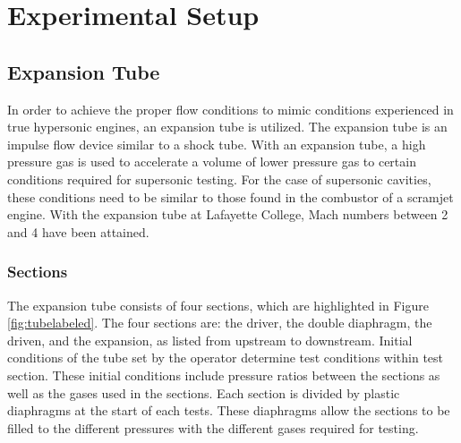 
\chapter{Experimental Setup} %

\label{Chapter3} %



\section{Expansion Tube}

In order to achieve the proper flow conditions to mimic conditions experienced in true hypersonic engines, an expansion tube is utilized. The expansion tube is an impulse flow device similar to a shock tube. With an expansion tube, a high pressure gas is used to accelerate a volume of lower pressure gas to certain conditions required for supersonic testing. For the case of supersonic cavities, these conditions need to be similar to those found in the combustor of a scramjet engine. With the expansion tube at Lafayette College, Mach numbers between 2 and 4 have been attained. 

\subsection{Sections}

The expansion tube consists of four sections, which are highlighted in Figure \ref{fig:tubelabeled}. The four sections are: the driver, the double diaphragm, the driven, and the expansion, as listed from upstream to downstream. Initial conditions of the tube set by the operator determine test conditions within test section. These initial conditions include pressure ratios between the sections as well as the gases used in the sections. Each section is divided by plastic diaphragms at the start of each tests. These diaphragms allow the sections to be filled to the different pressures with the different gases required for testing.

